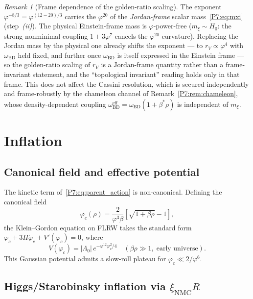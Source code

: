 \documentclass[11pt,a4paper]{article}
\theoremstyle{definition}
\theoremstyle{remark}
\newtheorem{remark}[theorem]{Remark}
\newcommand{\vp}{\varphi}
\newcommand{\bst}{\beta^{*}}
\newcommand{\oBD}{\omega_{\mathrm{BD}}}
\newcommand{\xNMC}{\xi_{\mathrm{NMC}}}
\begin{document}
\begin{remark}[Frame dependence of the golden-ratio scaling]
\label{P7:rem:rV_frame}
The exponent $\vp^{-8/3}=\vp^{(12-20)/3}$ carries the $\vp^{20}$ of the
\emph{Jordan-frame} scalar mass~\eqref{P7:eq:mxi} (step~\emph{(ii)}).  The
physical Einstein-frame mass is $\vp$-power-free ($m_\xi\sim H_0$: the strong
nonminimal coupling $1+3\vp^7$ cancels the $\vp^{20}$ curvature).  Replacing
the Jordan mass by the physical one already shifts the exponent --- to
$r_V\propto\vp^4$ with $\oBD$ held fixed, and further once $\oBD$ is itself
expressed in the Einstein frame --- so the golden-ratio scaling of $r_V$ is a
Jordan-frame quantity rather than a frame-invariant statement, and the
``topological invariant'' reading holds only in that frame.  This does not
affect the Cassini resolution, which is secured independently and
frame-robustly by the chameleon channel of Remark~\ref{P7:rem:chameleon},
whose density-dependent coupling $\oBD^{\mathrm{eff}}=\oBD(1+\bst\rho)$ is
independent of $m_\xi$.
\end{remark}

\section{Inflation}
\label{P7:sec:inflation}

\subsection{Canonical field and effective potential}

The kinetic term of~\eqref{P7:eq:parent_action} is non-canonical.
Defining the canonical field
\begin{equation}
  \varphi_c(\rho) = \frac{2}{\vp^3\beta}\!\left[\sqrt{1+\beta\rho}-1\right],
  \label{P7:eq:phi_c}
\end{equation}
the Klein--Gordon equation on FLRW takes the standard form
$\ddot\varphi_c + 3H\dot\varphi_c + V'(\varphi_c)=0$, where
\begin{equation}
  V(\varphi_c) = |\Lambda_0|\,e^{-\vp^{12}\varphi_c^2/4}
  \quad(\beta\rho\gg1,\;\text{early universe}).
  \label{P7:eq:Vinf}
\end{equation}
This Gaussian potential admits a slow-roll plateau for
$\varphi_c\ll2/\vp^6$.

\subsection{Higgs/Starobinsky inflation via $\xNMC R$}
\end{document}
